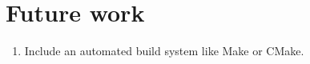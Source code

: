 \documentclass[a4paper,12pt]{article}
\begin{document}
\section{Future work}
\begin{enumerate}
  \item Include an automated build system like Make or CMake.
\end{enumerate}
\end{document}
